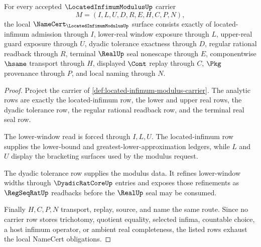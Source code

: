 \begin{theorem}
\label{thm:located-infimum-modulus-obligations}
For every accepted $\LocatedInfimumModulusUp$ carrier
$$
M=(I,L,U,D,R,E,H,C,P,N),
$$
the local $\NameCert_{\LocatedInfimumModulusUp}$ surface consists exactly of located-infimum admission through $I$, lower-real window exposure through $L$, upper-real guard exposure through $U$, dyadic tolerance exactness through $D$, regular rational readback through $R$, terminal $\RealUp$ seal nonescape through $E$, componentwise $\hsame$ transport through $H$, displayed $\Cont$ replay through $C$, $\Pkg$ provenance through $P$, and local naming through $N$.
\end{theorem}
\begin{proof}
Project the carrier of \autoref{def:located-infimum-modulus-carrier}. The analytic rows are exactly the located-infimum row, the lower and upper real rows, the dyadic tolerance row, the regular rational readback row, and the terminal real seal row.

The lower-window read is forced through $I,L,U$. The located-infimum row supplies the lower-bound and greatest-lower-approximation ledgers, while $L$ and $U$ display the bracketing surfaces used by the modulus request.

The dyadic tolerance row supplies the modulus data. It refines lower-window widths through $\DyadicRatCoreUp$ entries and exposes those refinements as $\RegSeqRatUp$ readbacks before the $\RealUp$ seal may be consumed.

Finally $H,C,P,N$ transport, replay, source, and name the same route. Since no carrier row stores trichotomy, quotient equality, selected infima, countable choice, a host infimum operator, or ambient real completeness, the listed rows exhaust the local NameCert obligations.
\end{proof}

